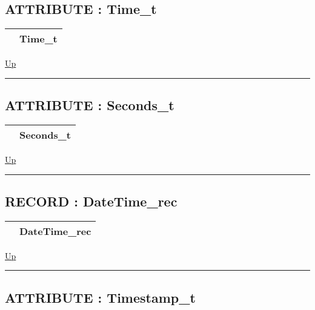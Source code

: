 \subsection*{ATTRIBUTE : Time\_t}
\hypertarget{ecldoc:date.time_t}{}

{\renewcommand{\arraystretch}{1.5}
\begin{tabularx}{\textwidth}{|>{\raggedright\arraybackslash}l|X|}
\hline
\hspace{0pt} & Time\_t \\
\hline
\end{tabularx}
}

\hyperlink{ecldoc:Date}{Up}

\par


\rule{\textwidth}{0.4pt}
\subsection*{ATTRIBUTE : Seconds\_t}
\hypertarget{ecldoc:date.seconds_t}{}

{\renewcommand{\arraystretch}{1.5}
\begin{tabularx}{\textwidth}{|>{\raggedright\arraybackslash}l|X|}
\hline
\hspace{0pt} & Seconds\_t \\
\hline
\end{tabularx}
}

\hyperlink{ecldoc:Date}{Up}

\par


\rule{\textwidth}{0.4pt}
\subsection*{RECORD : DateTime\_rec}
\hypertarget{ecldoc:date.datetime_rec}{}

{\renewcommand{\arraystretch}{1.5}
\begin{tabularx}{\textwidth}{|>{\raggedright\arraybackslash}l|X|}
\hline
\hspace{0pt} & DateTime\_rec \\
\hline
\end{tabularx}
}

\hyperlink{ecldoc:Date}{Up}

\par


\rule{\textwidth}{0.4pt}
\subsection*{ATTRIBUTE : Timestamp\_t}
\hypertarget{ecldoc:date.timestamp_t}{}

